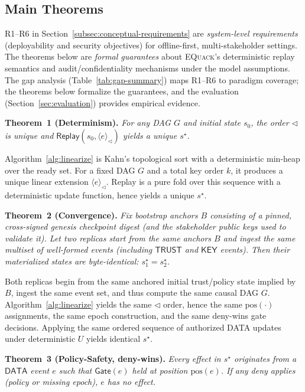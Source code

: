 \documentclass[10pt,journal,compsoc]{IEEEtran}
\newcommand{\equack}{\textsc{EQuack}}
\begin{document}
\subsection{Main Theorems}\label{subsec:main-theorems}

R1--R6 in Section~\ref{subsec:conceptual-requirements} are \emph{system-level requirements} (deployability and security objectives) for offline-first, multi-stakeholder settings.
The theorems below are \emph{formal guarantees} about \equack{}'s deterministic replay semantics and audit/confidentiality mechanisms under the model assumptions.
The gap analysis (Table~\ref{tab:gap-summary}) maps R1--R6 to paradigm coverage; the theorems below formalize the guarantees, and the evaluation (Section~\ref{sec:evaluation}) provides empirical evidence.

\noindent\textbf{Theorem~1 (Determinism).}
\textit{For any DAG $G$ and initial state $s_0$, the order $\triangleleft$ is unique and
$\mathsf{Replay}(s_0,\langle e\rangle_{\triangleleft})$ yields a unique $s^\star$.}


Algorithm~\ref{alg:linearize} is Kahn's topological sort with a deterministic min-heap over the ready set. For a fixed DAG $G$ and a total key order $k$, it produces a unique linear extension $\langle e\rangle_{\triangleleft}$. Replay is a pure fold over this sequence with a deterministic update function, hence yields a unique $s^\star$.

\medskip
\noindent\textbf{Theorem~2 (Convergence).}
\textit{Fix bootstrap anchors $B$ consisting of a pinned, cross-signed genesis checkpoint digest (and the stakeholder public keys used to validate it).
Let two replicas start from the same anchors $B$ and ingest the same multiset of well-formed events (including $\mathsf{TRUST}$ and $\mathsf{KEY}$ events).
Then their materialized states are byte-identical: $s^\star_1 = s^\star_2$.}


Both replicas begin from the same anchored initial trust/policy state implied by $B$, ingest the same event set, and thus compute the same causal DAG $G$.
Algorithm~\ref{alg:linearize} yields the same $\triangleleft$ order, hence the same $\mathrm{pos}(\cdot)$ assignments, the same epoch construction, and the same deny-wins gate decisions.
Applying the same ordered sequence of authorized \textsc{DATA} updates under deterministic $U$ yields identical $s^\star$.

\medskip
\noindent\textbf{Theorem~3 (Policy-Safety, deny-wins).}
\textit{Every effect in $s^\star$ originates from a $\mathsf{DATA}$ event $e$ such that $\mathsf{Gate}(e)$ held at position $\mathrm{pos}(e)$.
If any deny applies (policy or missing epoch), $e$ has no effect.}
\end{document}
